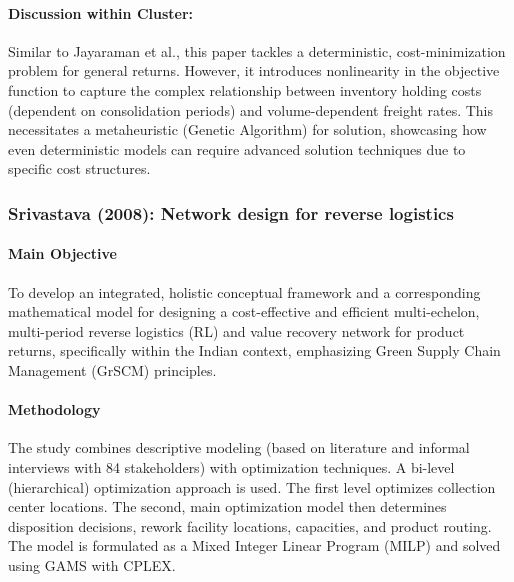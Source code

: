 \paragraph{Discussion within Cluster:} Similar to Jayaraman et al., this paper tackles a deterministic, cost-minimization problem for general returns. However, it introduces nonlinearity in the objective function to capture the complex relationship between inventory holding costs (dependent on consolidation periods) and volume-dependent freight rates. This necessitates a metaheuristic (Genetic Algorithm) for solution, showcasing how even deterministic models can require advanced solution techniques due to specific cost structures.

\subsubsection{Srivastava (2008): Network design for reverse logistics}
\paragraph{Main Objective} To develop an integrated, holistic conceptual framework and a corresponding mathematical model for designing a cost-effective and efficient multi-echelon, multi-period reverse logistics (RL) and value recovery network for product returns, specifically within the Indian context, emphasizing Green Supply Chain Management (GrSCM) principles.
\paragraph{Methodology} The study combines descriptive modeling (based on literature and informal interviews with 84 stakeholders) with optimization techniques. A bi-level (hierarchical) optimization approach is used. The first level optimizes collection center locations. The second, main optimization model then determines disposition decisions, rework facility locations, capacities, and product routing. The model is formulated as a Mixed Integer Linear Program (MILP) and solved using GAMS with CPLEX.

